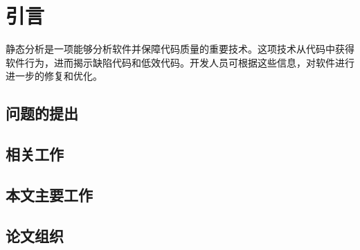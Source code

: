 
\chapter{引言}

静态分析是一项能够分析软件并保障代码质量的重要技术。这项技术从代码中获得软件行为，进而揭示缺陷代码和低效代码。开发人员可根据这些信息，对软件进行进一步的修复和优化。

\section{问题的提出}

\section{相关工作}

\section{本文主要工作}

\section{论文组织}

